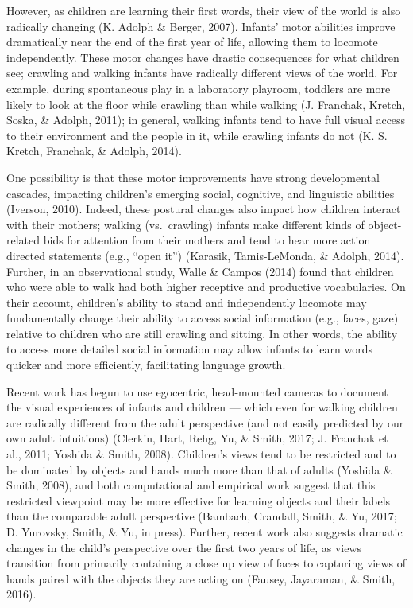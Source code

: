 \documentclass[10pt, letterpaper]{article}
\begin{document}
However, as children are learning their first words, their view of the
world is also radically changing (K. Adolph \& Berger, 2007). Infants'
motor abilities improve dramatically near the end of the first year of
life, allowing them to locomote independently. These motor changes have
drastic consequences for what children see; crawling and walking infants
have radically different views of the world. For example, during
spontaneous play in a laboratory playroom, toddlers are more likely to
look at the floor while crawling than while walking (J. Franchak,
Kretch, Soska, \& Adolph, 2011); in general, walking infants tend to
have full visual access to their environment and the people in it, while
crawling infants do not (K. S. Kretch, Franchak, \& Adolph, 2014).

One possibility is that these motor improvements have strong
developmental cascades, impacting children's emerging social, cognitive,
and linguistic abilities (Iverson, 2010). Indeed, these postural changes
also impact how children interact with their mothers; walking
(vs.~crawling) infants make different kinds of object-related bids for
attention from their mothers and tend to hear more action directed
statements (e.g., ``open it'') (Karasik, Tamis-LeMonda, \& Adolph,
2014). Further, in an observational study, Walle \& Campos (2014) found
that children who were able to walk had both higher receptive and
productive vocabularies. On their account, children's ability to stand
and independently locomote may fundamentally change their ability to
access social information (e.g., faces, gaze) relative to children who
are still crawling and sitting. In other words, the ability to access
more detailed social information may allow infants to learn words
quicker and more efficiently, facilitating language growth.

Recent work has begun to use egocentric, head-mounted cameras to
document the visual experiences of infants and children --- which even
for walking children are radically different from the adult perspective
(and not easily predicted by our own adult intuitions) (Clerkin, Hart,
Rehg, Yu, \& Smith, 2017; J. Franchak et al., 2011; Yoshida \& Smith,
2008). Children's views tend to be restricted and to be dominated by
objects and hands much more than that of adults (Yoshida \& Smith,
2008), and both computational and empirical work suggest that this
restricted viewpoint may be more effective for learning objects and
their labels than the comparable adult perspective (Bambach, Crandall,
Smith, \& Yu, 2017; D. Yurovsky, Smith, \& Yu, in press). Further,
recent work also suggests dramatic changes in the child's perspective
over the first two years of life, as views transition from primarily
containing a close up view of faces to capturing views of hands paired
with the objects they are acting on (Fausey, Jayaraman, \& Smith, 2016).
\end{document}
